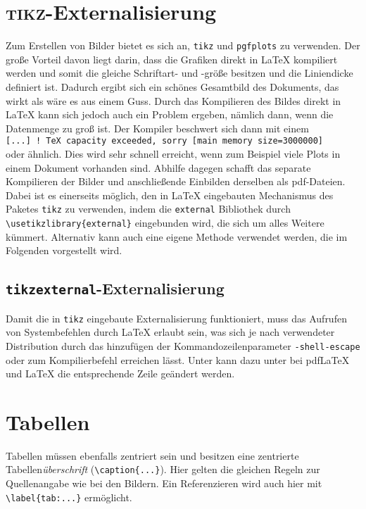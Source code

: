 \section{\textsc{tikz}-Externalisierung}
\label{sec:External}
Zum Erstellen von Bilder bietet es sich an, \texttt{tikz} und \texttt{pgfplots} zu verwenden.
Der große Vorteil davon liegt darin, dass die Grafiken direkt in \LaTeX{} kompiliert werden und somit die gleiche Schriftart- und -größe besitzen und die Liniendicke definiert ist.
Dadurch ergibt sich ein schönes Gesamtbild des Dokuments, das wirkt als wäre es aus einem Guss.
Durch das Kompilieren des Bildes direkt in \LaTeX{} kann sich jedoch auch ein Problem ergeben, nämlich dann, wenn die Datenmenge zu groß ist.
Der Kompiler beschwert sich dann mit einem\\
\texttt{[...] ! TeX capacity exceeded, sorry [main memory size=3000000]}\\
oder ähnlich.
Dies wird sehr schnell erreicht, wenn zum Beispiel viele Plots in einem Dokument vorhanden sind.
Abhilfe dagegen schafft das separate Kompilieren der Bilder und anschließende Einbilden derselben als pdf-Dateien.
Dabei ist es einerseits möglich, den in \LaTeX{} eingebauten Mechanismus des Paketes \texttt{tikz} zu verwenden, indem die \texttt{external} Bibliothek durch \verb|\usetikzlibrary{external}| eingebunden wird, die sich um alles Weitere kümmert.
Alternativ kann auch eine eigene Methode verwendet werden, die im Folgenden vorgestellt wird.

\subsection{\texttt{tikzexternal}-Externalisierung}
Damit die in \texttt{tikz} eingebaute Externalisierung funktioniert, muss das Aufrufen von Systembefehlen durch \LaTeX{} erlaubt sein, was sich je nach verwendeter Distribution durch das hinzufügen der Kommandozeilenparameter \zitat\texttt{{-shell-escape}} oder  zum Kompilierbefehl erreichen lässt.
Unter \Texstudio{} kann dazu unter  bei pdf\LaTeX{} und \LaTeX{} die entsprechende Zeile geändert werden.


\section{Tabellen}
Tabellen müssen ebenfalls zentriert sein und besitzen eine zentrierte Tabellen\emph{überschrift} (\verb|\caption{...}|).
Hier gelten die gleichen Regeln zur Quellenangabe wie bei den Bildern.
Ein Referenzieren wird auch hier mit \verb|\label{tab:...}| ermöglicht.

